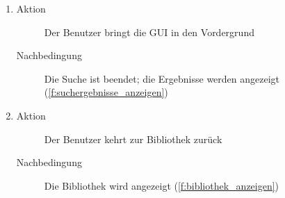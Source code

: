\begin{enumerate} [label=\bfseries /TSW \arabic*0/, leftmargin=*]
\begin{enumerate}[leftmargin=0pt]
\begin{description}
			\item[Nachbedingung] Es ist ein Signalton zu hören (\ref{fw:signalton})
		\end{description}
		\item
		\begin{description}
			\item[Aktion] Der Benutzer bringt die GUI in den Vordergrund
			\item[Nachbedingung] Die Suche ist beendet; die Ergebnisse werden angezeigt (\ref{f:suchergebnisse_anzeigen})
		\end{description}
		\item
		\begin{description}
			\item[Aktion] Der Benutzer kehrt zur Bibliothek zurück
			\item[Nachbedingung] Die Bibliothek wird angezeigt (\ref{f:bibliothek_anzeigen})
		\end{description}


\end{enumerate}
\end{enumerate}
